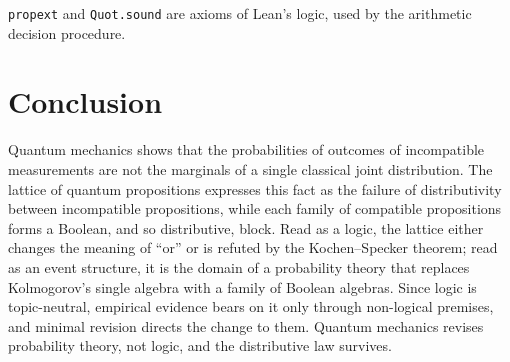 \documentclass{situationist-preprint}
\begin{document}
\texttt{propext} and \texttt{Quot.sound} are axioms of Lean's logic, used by the arithmetic decision procedure.

\section{Conclusion}

Quantum mechanics shows that the probabilities of outcomes of incompatible measurements are not the marginals of a single classical joint distribution. The lattice of quantum propositions expresses this fact as the failure of distributivity between incompatible propositions, while each family of compatible propositions forms a Boolean, and so distributive, block. Read as a logic, the lattice either changes the meaning of \enquote{or} or is refuted by the Kochen--Specker theorem; read as an event structure, it is the domain of a probability theory that replaces Kolmogorov's single algebra with a family of Boolean algebras. Since logic is topic-neutral, empirical evidence bears on it only through non-logical premises, and minimal revision directs the change to them. Quantum mechanics revises probability theory, not logic, and the distributive law survives.
\end{document}
